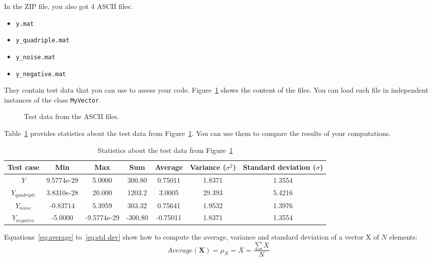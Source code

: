 \documentclass[english,a4paper,12pt,oneside]{article}
\begin{document}
In the ZIP file, you also got 4 ASCII files:
\begin{itemize}
 \item \verb+y.mat+
 \item \verb+y_quadriple.mat+
 \item \verb+y_noise.mat+
 \item \verb+y_negative.mat+
\end{itemize}
They contain test data that you can use to assess your code. 
Figure~\ref{fig:test data} shows the content of the files. 
You can load each file in independent instances of the class \verb+MyVector+. 
\begin{figure}[htb]
\centering
\scalebox{0.75}{}
 \caption{\label{fig:test data}Test data from the ASCII files.}
\end{figure}
Table~\ref{tab:test data} provides statistics about the test data from Figure~\ref{fig:test data}. 
You can use them to compare the results of your computations. 
\begin{table}[htb]
\caption{\label{tab:test data}Statistics about the test data from Figure~\ref{fig:test data}}
\centering
\begin{footnotesize}
 \begin{tabular}{|c|c|c|c|c|c|c|}
  \hline
  \textbf{Test case} & \textbf{Min} & \textbf{Max} & \textbf{Sum} & \textbf{Average} & \textbf{Variance} ($\sigma^2$) & \textbf{Standard deviation} ($\sigma$)\\
  \hline
  \hline
  $Y$ & 9.5774e-29 & 5.0000 & 300.80 & 0.75011 & 1.8371 & 1.3554 \\
  \hline
  $Y_{quadriple}$ & 3.8310e-28 & 20.000 & 1203.2 & 3.0005 & 29.393 & 5.4216 \\
  \hline
  $Y_{noise}$ & -0.83714 & 5.3959 & 303.32 & 0.75641 & 1.9532 & 1.3976 \\
  \hline
  $Y_{negative}$ & -5.0000 & -9.5774e-29 & -300.80 & -0.75011 & 1.8371 & 1.3554 \\
  \hline
 \end{tabular}
\end{footnotesize}
\end{table}

Equations~\ref{eq:average} to~\ref{eq:std dev} show how to compute the average, variance and standard deviation of a vector $\mathrm{X}$ of $N$ elements:
\begin{equation}
 Average(\mathbf{X}) = \mu_X = \overline{X} = \frac{\sum X}{N}
 \label{eq:average}
\end{equation}
\end{document}
